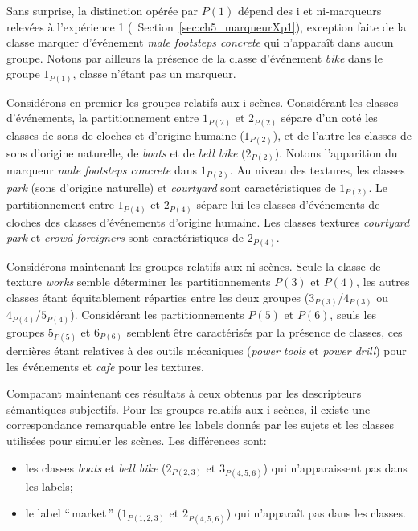 Sans surprise, la distinction opérée par $P(1)$ dépend des i et ni-marqueurs relevées à l'expérience 1 (\cf~Section~\ref{sec:ch5_marqueurXp1}), exception faite de la classe marquer d'événement \emph{male footsteps concrete} qui n'apparaît dans aucun groupe. Notons par ailleurs la présence de la classe d'événement \emph{bike} dans le groupe $1_{P(1)}$, classe n'étant pas un marqueur.

Considérons en premier les groupes relatifs aux i-scènes. Considérant les classes d'événements, la partitionnement entre $1_{P(2)}$ et $2_{P(2)}$ sépare d'un coté  les classes de sons de cloches et d'origine humaine ($1_{P(2)}$), et de l'autre les classes de sons d'origine naturelle, de \emph{boats} et de \emph{bell bike} ($2_{P(2)}$). Notons l'apparition du marqueur \emph{male footsteps concrete} dans $1_{P(2)}$. Au niveau des textures, les classes \emph{park} (sons d'origine naturelle)  et \emph{courtyard}  sont caractéristiques de $1_{P(2)}$. Le partitionnement entre  $1_{P(4)}$ et $2_{P(4)}$ sépare lui les classes d'événements de cloches des classes d'événements d'origine humaine.  Les classes textures \emph{courtyard park} et \emph{crowd foreigners} sont caractéristiques de $2_{P(4)}$.

Considérons maintenant les groupes relatifs aux ni-scènes. Seule la classe de texture \emph{works} semble déterminer les partitionnements $P(3)$ et $P(4)$, les autres classes étant équitablement réparties entre les deux groupes ($3_{P(3)}$/$4_{P(3)}$ ou $4_{P(4)}$/$5_{P(4)}$). Considérant les partitionnements  $P(5)$ et $P(6)$, seuls les groupes $5_{P(5)}$ et $6_{P(6)}$ semblent être caractérisés par la présence de classes, ces dernières étant relatives à des outils mécaniques (\emph{power tools} et \emph{power drill}) pour les événements et \emph{cafe} pour les textures.

Comparant maintenant ces résultats à ceux obtenus par les descripteurs sémantiques subjectifs. Pour les groupes relatifs aux i-scènes, il existe une correspondance remarquable entre les labels donnés par les sujets et les classes utilisées pour simuler les scènes. Les différences sont:

\begin{itemize}
\item les classes \emph{boats} et \emph{bell bike} ($2_{P(2,3)}$ et $3_{P(4,5,6)}$) qui n’apparaissent pas dans les labels;
\item le label ``\,market\,'' ($1_{P(1,2,3)}$ et $2_{P(4,5,6)}$) qui n'apparaît pas dans les classes.
\end{itemize} 

